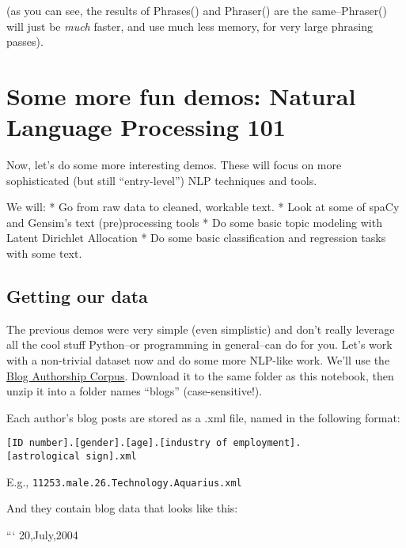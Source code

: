 \documentclass[11pt]{article}
\begin{document}
    (as you can see, the results of Phrases() and Phraser() are the
same--Phraser() will just be \emph{much} faster, and use much less
memory, for very large phrasing passes).

    \hypertarget{some-more-fun-demos-natural-language-processing-101}{%
\section{Some more fun demos: Natural Language Processing
101}\label{some-more-fun-demos-natural-language-processing-101}}

Now, let's do some more interesting demos. These will focus on more
sophisticated (but still ``entry-level'') NLP techniques and tools.

We will: * Go from raw data to cleaned, workable text. * Look at some of
spaCy and Gensim's text (pre)processing tools * Do some basic topic
modeling with Latent Dirichlet Allocation * Do some basic classification
and regression tasks with some text.

    \hypertarget{getting-our-data}{%
\subsection{Getting our data}\label{getting-our-data}}

    The previous demos were very simple (even simplistic) and don't really
leverage all the cool stuff Python--or programming in general--can do
for you. Let's work with a non-trivial dataset now and do some more
NLP-like work. We'll use the
\href{http://u.cs.biu.ac.il/~koppel/BlogCorpus.htm}{Blog Authorship
Corpus}. Download it to the same folder as this notebook, then unzip it
into a folder names ``blogs'' (case-sensitive!).

Each author's blog posts are stored as a .xml file, named in the
following format:

\texttt{{[}ID\ number{]}.{[}gender{]}.{[}age{]}.{[}industry\ of\ employment{]}.{[}astrological\ sign{]}.xml}

E.g., \texttt{11253.male.26.Technology.Aquarius.xml}

And they contain blog data that looks like this:

    ``` 20,July,2004
\end{document}
